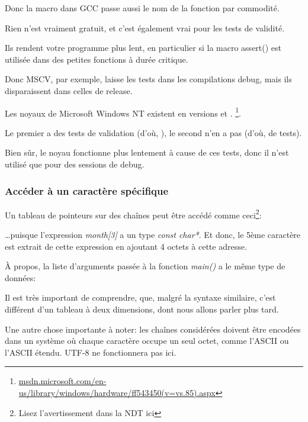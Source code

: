 

Donc la macro dans GCC passe aussi le nom de la fonction par commodité.

Rien n'est vraiment gratuit, et c'est également vrai pour les tests de validité.

Ils rendent votre programme plus lent, en particulier si la macro assert() est utilisée
dans des petites fonctions à durée critique.

Donc MSCV, par exemple, laisse les tests dans les compilations debug, mais ils disparaissent
dans celles de release.

Les noyaux de Microsoft \gls{Windows NT} existent en versions  et .
\footnote{\href{http://msdn.microsoft.com/en-us/library/windows/hardware/ff543450(v=vs.85).aspx}{msdn.microsoft.com/en-us/library/windows/hardware/ff543450(v=vs.85).aspx}}.

Le premier a des tests de validation (d'où, ), le second n'en a pas (d'où,  de tests).

Bien sûr, le noyau  fonctionne plus lentement à cause de ces tests, donc
il n'est utilisé que pour des sessions de debug.


\subsubsection{Accéder à un caractère spécifique}

Un tableau de pointeurs sur des chaînes peut être accédé comme ceci\footnote{Lisez
l'avertissement dans la NDT ici }:



\dots puisque l'expression \emph{month[3]} a un type \emph{const char*}.
Et donc, le 5ème caractère est extrait de cette expression en ajoutant 4 octets à
cette adresse.

À propos, la liste d'arguments passée à la fonction \emph{main()} a le même type de
données:



Il est très important de comprendre, que, malgré la syntaxe similaire, c'est différent
d'un tableau à deux dimensions, dont nous allons parler plus tard.

Une autre chose importante à noter: les chaînes considérées doivent être encodées
dans un système où chaque caractère occupe un seul octet, comme l'\ac{ASCII} ou l'\ac{ASCII}
étendu.
UTF-8 ne fonctionnera pas ici.

